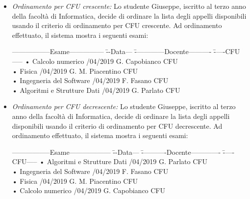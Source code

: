 \begin{itemize}
	\item \textit{Ordinamento per CFU crescente:}
	Lo studente Giuseppe, iscritto al terzo anno della facoltà di Informatica, decide di ordinare la lista degli appelli disponibili usando il criterio di ordinamento per CFU crescente. Ad ordinamento effettuato, il sistema mostra i seguenti esami:
	\begin{tabbing}
		\hspace{1cm}-----------------Esame--------------- \= --Data--- \= -------------Docente---------- \= -----CFU-----\kill
		\hspace{1cm} • Calcolo numerico /04/2019  \> \hspace{1cm} G. Capobianco  CFU\\
		\hspace{1cm} • Fisica /04/2019 \> \hspace{1cm} G. M. Piacentino   CFU\\
		\hspace{1cm} • Ingegneria del Software /04/2019   \> \hspace{1cm} F. Fasano  CFU\\
		\hspace{1cm} • Algoritmi e Strutture Dati /04/2019 \> \hspace{1cm} G. Parlato  CFU\\	
	\end{tabbing}
	
	\item \textit{Ordinamento per CFU decrescente:}
	Lo studente Giuseppe, iscritto al terzo anno della facoltà di Informatica, decide di ordinare la lista degli appelli disponibili usando il criterio di ordinamento per CFU decrescente. Ad ordinamento effettuato, il sistema mostra i seguenti esami:
	\begin{tabbing}
		\hspace{1cm}-----------------Esame------------------ \= --Data--- \= -----------Docente------------- \= -----CFU----- \kill
		\hspace{1cm} • Algoritmi e Strutture Dati /04/2019 \> \hspace{1cm} G. Parlato  CFU\\
		\hspace{1cm} • Ingegneria del Software /04/2019   \> \hspace{1cm} F. Fasano  CFU\\
		\hspace{1cm} • Fisica /04/2019 \> \hspace{1cm} G. M. Piacentino   CFU\\
		\hspace{1cm} • Calcolo numerico /04/2019  \> \hspace{1cm} G. Capobianco  CFU\\	
	\end{tabbing} 
	

\end{itemize}
